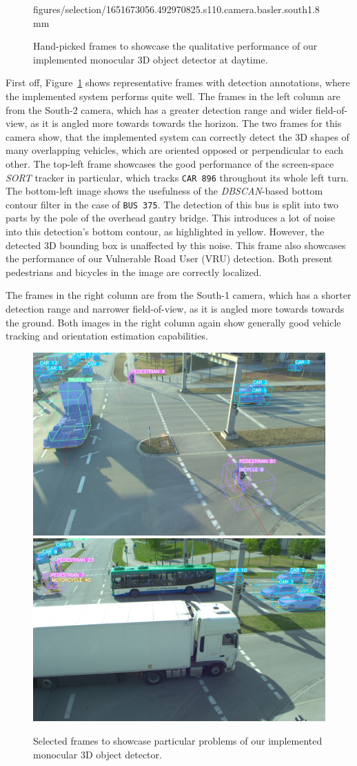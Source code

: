 \begin{figure}[htb]
{        figures/selection/1651673056.492970825.s110.camera.basler.south1.8mm}
    \caption{Hand-picked frames to showcase the qualitative performance of our implemented monocular 3D object detector at daytime.}
    \label{fig:qualitative-results-day}
\end{figure}

First off, Figure~\ref{fig:qualitative-results-day} shows representative frames with detection annotations, where the implemented system performs quite well.
The frames in the left column are from the South-2 camera, which has a greater detection range and wider field-of-view, as it is angled more towards towards the horizon.
The two frames for this camera show, that the implemented system can correctly detect the 3D shapes of many overlapping vehicles, which are oriented opposed or perpendicular to each other.
The top-left frame showcases the good performance of the screen-space \textit{SORT} tracker in particular, which tracks \texttt{CAR 896} throughout its whole left turn.
The bottom-left image shows the usefulness of the \textit{DBSCAN}-based bottom contour filter in the case of \texttt{BUS 375}.
The detection of this bus is split into two parts by the pole of the overhead gantry bridge.
This introduces a lot of noise into this detection's bottom contour, as highlighted in yellow.
However, the detected 3D bounding box is unaffected by this noise.
This frame also showcases the performance of our Vulnerable Road User (VRU) detection.
Both present pedestrians and bicycles in the image are correctly localized.

The frames in the right column are from the South-1 camera, which has a shorter detection range and narrower field-of-view, as it is angled more towards towards the ground.
Both images in the right column again show generally good vehicle tracking and orientation estimation capabilities.

\begin{figure}[htb]
    \includegraphics[width=0.499\linewidth]{
        figures/selection/1646667395.641065639.s110.camera.basler.south1.8mm}
    \includegraphics[width=0.499\linewidth]{
        figures/selection/1651673050.162472285.s110.camera.basler.south1.8mm}
    \caption{Selected frames to showcase particular problems of our implemented monocular 3D object detector.}
    \label{fig:qualitative-results-bad}
\end{figure}

